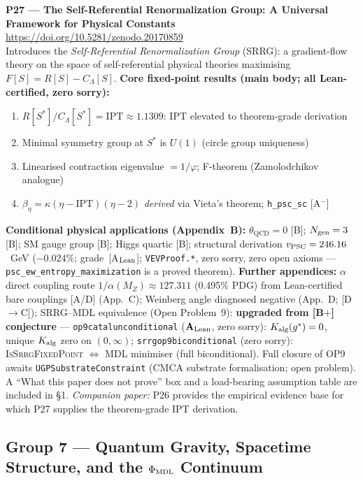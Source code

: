 \documentclass[11pt]{article}
\newcommand{\lean}[1]{%
  \penalty-100
  \begingroup\def\_{{\textunderscore\allowbreak}}\texttt{#1}\endgroup}
\newcommand{\CatAL}{\ensuremath{\textbf{A}_{\rm Lean}}}
\begin{document}
\medskip
\noindent\textbf{P27 — The Self-Referential Renormalization Group: A Universal
Framework for Physical Constants}~\cite{SpivackSRRG}\\
\url{https://doi.org/10.5281/zenodo.20170859}\\
Introduces the \emph{Self-Referential Renormalization Group} (SRRG): a gradient-flow
theory on the space of self-referential physical theories maximising
$F[S] = R[S] - C_\Lambda[S]$.
\textbf{Core fixed-point results (main body; all Lean-certified, zero sorry):}
\begin{enumerate}[noitemsep,topsep=2pt]
\item $R[S^*]/C_\Lambda[S^*] = \mathrm{IPT} \approx 1.1309$: IPT elevated to theorem-grade derivation
\item Minimal symmetry group at $S^*$ is $U(1)$ (circle group uniqueness)
\item Linearised contraction eigenvalue $= 1/\varphi$; F-theorem (Zamolodchikov analogue)
\item $\beta_\eta = \kappa(\eta-\mathrm{IPT})(\eta-2)$ \emph{derived} via Vieta's theorem; \texttt{h\_psc\_sc} [A$^-$]
\end{enumerate}
\textbf{Conditional physical applications (Appendix~B):}
$\theta_{\mathrm{QCD}}=0$ [B]; $N_{\rm gen}=3$ [B]; SM gauge group [B]; Higgs quartic [B];
structural derivation $v_{\rm PSC} = 246.16$~GeV ($-0.024\%$; grade~[A$_{\rm Lean}$];
\texttt{VEVProof.*}, zero sorry, zero open axioms --- \texttt{psc\_ew\_entropy\_maximization}
is a proved theorem).
\textbf{Further appendices:}
$\alpha$ direct coupling route $1/\alpha(M_Z)\approx127.311$ (0.495\% PDG) from
Lean-certified bare couplings [A/D] (App.~C);
Weinberg angle diagnosed negative (App.~D; [D$\to$C]);
SRRG--MDL equivalence (Open Problem~9): \textbf{upgraded from [B$+$] conjecture} ---
\lean{op9\_catal\_unconditional} ($\CatAL$, zero sorry): $K_{\rm alg}(g^*)=0$, unique
$K_{\rm alg}$ zero on $(0,\infty)$; \lean{srrg\_op9\_biconditional} (zero sorry):
\textsc{IsSrrgFixedPoint} $\Leftrightarrow$ MDL minimiser (full biconditional).
Full closure of OP9 awaits \lean{UGPSubstrateConstraint} (CMCA substrate formalisation; open problem).
A ``What this paper does not prove'' box and a load-bearing assumption table
are included in §1. \emph{Companion paper:} P26 provides the empirical evidence base
for which P27 supplies the theorem-grade IPT derivation.

\subsection{Group 7 — Quantum Gravity, Spacetime Structure, and the \texorpdfstring{$\Phi_{\rm MDL}$}{Phi\_MDL} Continuum}
\end{document}
